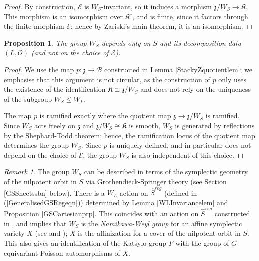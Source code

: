 \documentclass{amsart}
\newtheorem{proposition}[theorem]{Proposition}
\theoremstyle{remark}
\newtheorem{remark}[theorem]{Remark}
\numberwithin{theorem}{section}
\numberwithin{equation}{section}
\begin{document}
\begin{proof}
By construction, $\mathcal E$ is $W_S$-invariant, so it induces a morphism $\mathfrak{z}/W_S \rightarrow \mathfrak{K}$. This morphism is an isomorphism over $\mathfrak{K}^\circ$, and is finite, since it factors through the finite morphism $\mathcal E$; hence by Zariski's main theorem, it is an isomorphism.
\end{proof}

\begin{proposition}\label{WSEIndprp}
    The group $W_S$ depends only on $S$ and its decomposition data $(L, \mathcal O)$ (and not on the choice of $\mathcal E$).
\end{proposition} 

\begin{proof} 
We use the map $p:\mathfrak{z} \rightarrow \mathcal B$ constructed in Lemma \ref{StackyZquotientlem}; we emphasise that this argument is not circular, as the construction of $p$ only uses the existence of the identification $\mathfrak{K} \cong \mathfrak{z}/W_S$ and does not rely on the uniqueness of the subgroup $W_S \leq W_L$.

The map $p$ is ramified exactly where the quotient map $\mathfrak{z} \rightarrow \mathfrak{z}/W_S$ is ramified. Since $W_S$ acts freely on $\mathfrak{z}$ and $\mathfrak{z}/W_S \cong \mathfrak{K}$ is smooth, $W_S$ is generated by reflections by the Shephard-Todd theorem; hence, the ramification locus of the quotient map determines the group $W_S$. Since $p$ is uniquely defined, and in particular does not depend on the choice of $\mathcal E$, the group $W_S$ is also independent of this choice.
\end{proof}

\begin{remark}\label{NamikawaWeylGprmk}
   The group $W_S$ can be described in terms of the symplectic geometry of the nilpotent orbit in $S$ via Grothendieck-Springer theory (see Section \ref{GSSheetssbn} below). There is a $W_L$-action on $\hat{S}^{reg}$ (defined in (\ref{GeneralisedGSRegeqn})) determined by Lemma \ref{WLInvariancelem} and Proposition \ref{GSCartesianprp}. This coincides with an action on $\hat{S}^{reg}$ constructed in \cite[Lemma 4.8]{Losev4}, and \cite[Proposition 4.7 (3)]{Losev4} implies that $W_S$ is the \emph{Namikawa-Weyl group} for an affine symplectic variety $X$ (see \cite[Section 2.3]{Losev4} and \cite[Section 1]{Namikawa}); $X$ is the affinization for a cover of the nilpotent orbit in $S$.  This also gives an identification of the Katsylo group $F$ with the group of $G$-equivariant Poisson automorphisms of $X$.
\end{remark}
\end{document}
